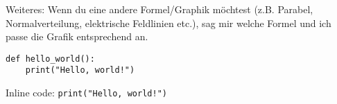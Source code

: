 \documentclass[a4paper,12pt]{article}
\begin{document}
Weiteres: Wenn du eine andere Formel/Graphik möchtest (z.B. Parabel, Normalverteilung, elektrische Feldlinien etc.), sag mir welche Formel und ich passe die Grafik entsprechend an.



\begin{verbatim}
def hello_world():
    print("Hello, world!")
\end{verbatim}


Inline code: \texttt{print("Hello, world!")}
\end{document}
